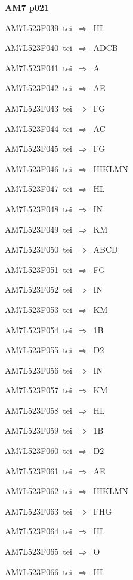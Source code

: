 \par\vfill\eject
{\bf\hfill AM7 p021\hfill\hbox{}}\par\bigskip
{\sixrm AM7L523F039\ {\sixit tei}\ }$\Rightarrow$\ HL\par\smallskip
{\sixrm AM7L523F040\ {\sixit tei}\ }$\Rightarrow$\ ADCB\par\smallskip
{\sixrm AM7L523F041\ {\sixit tei}\ }$\Rightarrow$\ A\par\smallskip
{\sixrm AM7L523F042\ {\sixit tei}\ }$\Rightarrow$\ AE\par\smallskip
{\sixrm AM7L523F043\ {\sixit tei}\ }$\Rightarrow$\ FG\par\smallskip
{\sixrm AM7L523F044\ {\sixit tei}\ }$\Rightarrow$\ AC\par\smallskip
{\sixrm AM7L523F045\ {\sixit tei}\ }$\Rightarrow$\ FG\par\smallskip
{\sixrm AM7L523F046\ {\sixit tei}\ }$\Rightarrow$\ HIKLMN\par\smallskip
{\sixrm AM7L523F047\ {\sixit tei}\ }$\Rightarrow$\ HL\par\smallskip
{\sixrm AM7L523F048\ {\sixit tei}\ }$\Rightarrow$\ IN\par\smallskip
{\sixrm AM7L523F049\ {\sixit tei}\ }$\Rightarrow$\ KM\par\smallskip
{\sixrm AM7L523F050\ {\sixit tei}\ }$\Rightarrow$\ ABCD\par\smallskip
{\sixrm AM7L523F051\ {\sixit tei}\ }$\Rightarrow$\ FG\par\smallskip
{\sixrm AM7L523F052\ {\sixit tei}\ }$\Rightarrow$\ IN\par\smallskip
{\sixrm AM7L523F053\ {\sixit tei}\ }$\Rightarrow$\ KM\par\smallskip
{\sixrm AM7L523F054\ {\sixit tei}\ }$\Rightarrow$\ 1B\par\smallskip
{\sixrm AM7L523F055\ {\sixit tei}\ }$\Rightarrow$\ D2\par\smallskip
{\sixrm AM7L523F056\ {\sixit tei}\ }$\Rightarrow$\ IN\par\smallskip
{\sixrm AM7L523F057\ {\sixit tei}\ }$\Rightarrow$\ KM\par\smallskip
{\sixrm AM7L523F058\ {\sixit tei}\ }$\Rightarrow$\ HL\par\smallskip
{\sixrm AM7L523F059\ {\sixit tei}\ }$\Rightarrow$\ 1B\par\smallskip
{\sixrm AM7L523F060\ {\sixit tei}\ }$\Rightarrow$\ D2\par\smallskip
{\sixrm AM7L523F061\ {\sixit tei}\ }$\Rightarrow$\ AE\par\smallskip
{\sixrm AM7L523F062\ {\sixit tei}\ }$\Rightarrow$\ HIKLMN\par\smallskip
{\sixrm AM7L523F063\ {\sixit tei}\ }$\Rightarrow$\ FHG\par\smallskip
{\sixrm AM7L523F064\ {\sixit tei}\ }$\Rightarrow$\ HL\par\smallskip
{\sixrm AM7L523F065\ {\sixit tei}\ }$\Rightarrow$\ O\par\smallskip
{\sixrm AM7L523F066\ {\sixit tei}\ }$\Rightarrow$\ HL\par\smallskip

